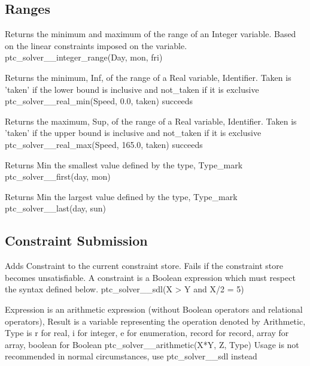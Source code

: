 \documentclass{article}
\begin{document}
\subsection{Ranges}

\hspace{\parindent}
        {Returns the minimum and maximum of the range of an Integer variable.
Based on the linear constraints imposed on the variable.}
        {ptc\_solver\_\_integer\_range(Day, mon, fri)}
        {}

        {Returns the minimum, Inf, of the range of a Real variable, Identifier.
Taken is 'taken' if the lower bound is inclusive and not\_taken if it is
exclusive}
        {ptc\_solver\_\_real\_min(Speed, 0.0, taken) succeeds}
        {}

        {Returns the maximum, Sup, of the range of a Real variable, Identifier.
Taken is 'taken' if the upper bound is inclusive and not\_taken if it is
exclusive}
        {ptc\_solver\_\_real\_max(Speed, 165.0, taken) succeeds}
        {}

        {Returns Min the smallest value defined by the type, Type\_mark}
        {ptc\_solver\_\_first(day, mon)}
        {}

        {Returns Min the largest value defined by the type, Type\_mark}
        {ptc\_solver\_\_last(day, sun)}
        {}

\subsection{Constraint Submission}

\hspace{\parindent}
    {Adds Constraint to the current constraint store. Fails if the constraint
store
    becomes unsatisfiable. A constraint is a Boolean expression which must
respect
    the syntax defined below.}
    {ptc\_solver\_\_sdl(X > Y and X/2 = 5)}
    {}

        {Expression is an arithmetic expression (without Boolean operators and
relational operators), Result is a variable representing the operation denoted by
Arithmetic, Type is r for real, i for integer, e
for enumeration, record for record, array for array, boolean for Boolean}
        {ptc\_solver\_\_arithmetic(X*Y, Z, Type)}
        {Usage is not recommended in normal circumstances, use ptc\_solver\_\_sdl
instead}
\end{document}
